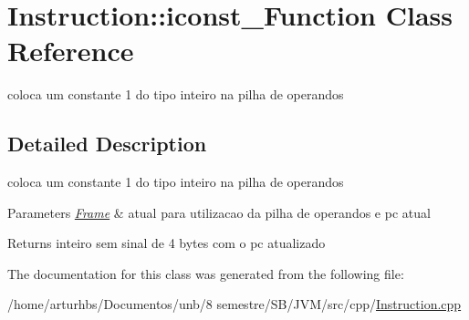 \hypertarget{classInstruction_1_1iconst__1Function}{}\section{Instruction\+:\+:iconst\+\_\+Function Class Reference}
\label{classInstruction_1_1iconst__1Function}


coloca um constante 1 do tipo inteiro na pilha de operandos  




\subsection{Detailed Description}
coloca um constante 1 do tipo inteiro na pilha de operandos 


\begin{DoxyParams}{Parameters}
{\em \hyperlink{classFrame}{Frame}} & atual para utilizacao da pilha de operandos e pc atual \\
\hline
\end{DoxyParams}
\begin{DoxyReturn}{Returns}
inteiro sem sinal de 4 bytes com o pc atualizado 
\end{DoxyReturn}


The documentation for this class was generated from the following file\+:\begin{DoxyCompactItemize}
\item 
/home/arturhbs/\+Documentos/unb/8 semestre/\+S\+B/\+J\+V\+M/src/cpp/\hyperlink{Instruction_8cpp}{Instruction.\+cpp}\end{DoxyCompactItemize}
